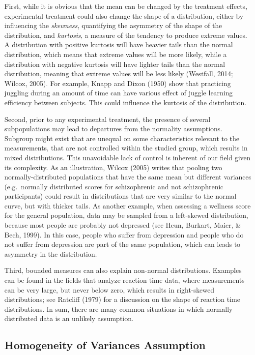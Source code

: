 \documentclass[man,floatsintext]{apa6}
\begin{document}
First, while it is obvious that the mean can be changed by the treatment effects, experimental treatment could also change the shape of a distribution, either by influencing the \emph{skewness}, quantifying the asymmetry of the shape of the distribution, and \emph{kurtosis}, a measure of the tendency to produce extreme values. A distribution with positive kurtosis will have heavier tails than the normal distribution, which means that extreme values will be more likely, while a distribution with negative kurtosis will have lighter tails than the normal distribution, meaning that extreme values will be less likely (Westfall, 2014; Wilcox, 2005). For example, Knapp and Dixon (1950) show that practicing juggling during an amount of time can have various effect of juggle learning efficiency between subjects. This could influence the kurtosis of the distribution.

Second, prior to any experimental treatment, the presence of several subpopulations may lead to departures from the normality assumptions. Subgroup might exist that are unequal on some characteristics relevant to the measurements, that are not controlled within the studied group, which results in mixed distributions. This unavoidable lack of control is inherent of our field given its complexity. As an illustration, Wilcox (2005) writes that pooling two normally-distributed populations that have the same mean but different variances (e.g.~normally distributed scores for schizophrenic and not schizophrenic participants) could result in distributions that are very similar to the normal curve, but with thicker tails. As another example, when assessing a wellness score for the general population, data may be sampled from a left-skewed distribution, because most people are probably not depressed (see Heun, Burkart, Maier, \& Bech, 1999). In this case, people who suffer from depression and people who do not suffer from depression are part of the same population, which can leads to asymmetry in the distribution.

Third, bounded measures can also explain non-normal distributions. Examples can be found in the fields that analyze reaction time data, where measurements can be very large, but never below zero, which results in right-skewed distributions; see Ratcliff (1979) for a discussion on the shape of reaction time distributions. In sum, there are many common situations in which normally distributed data is an unlikely assumption.

\hypertarget{homogeneity-of-variances-assumption}{%
\subsection{Homogeneity of Variances Assumption}\label{homogeneity-of-variances-assumption}}
\end{document}
